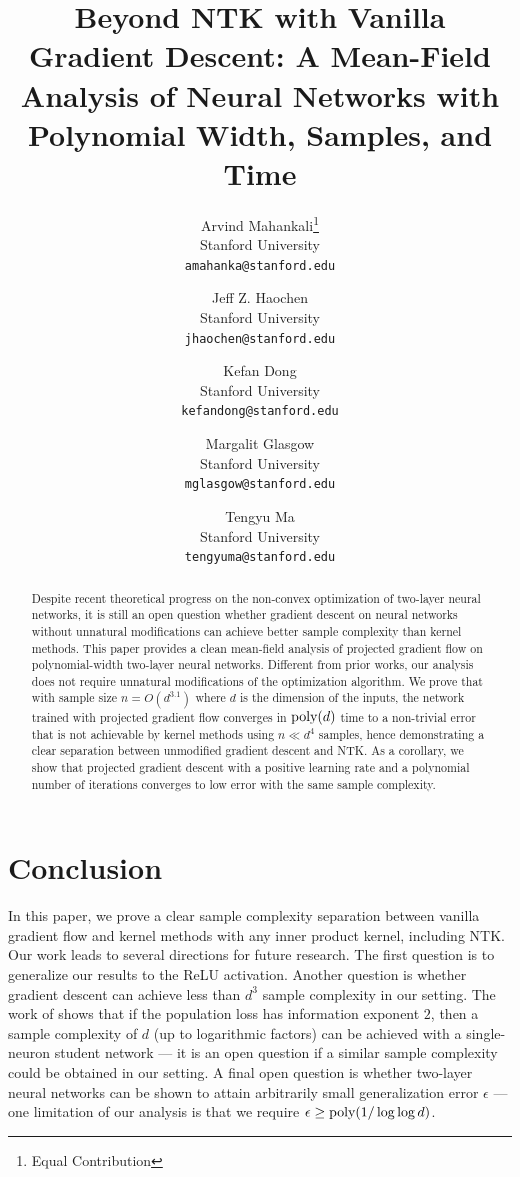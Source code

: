 \documentclass{article}
\title{Beyond NTK with Vanilla Gradient Descent: A Mean-Field Analysis of Neural Networks with Polynomial Width, Samples, and Time}
\author{%
Arvind Mahankali\thanks{Equal Contribution} \\
Stanford University\\
\texttt{amahanka@stanford.edu} \\
\and
Jeff Z. Haochen\footnotemark[1] \\
Stanford University\\
\texttt{jhaochen@stanford.edu} \\
\and
Kefan Dong \\
Stanford University\\
\texttt{kefandong@stanford.edu} \\
\and
Margalit Glasgow \\
Stanford University\\
\texttt{mglasgow@stanford.edu} \\
\and
Tengyu Ma \\
Stanford University \\
\texttt{tengyuma@stanford.edu}
}
\numberwithin{equation}{section}
\numberwithin{theorem}{section}
\begin{document}
	
	
\maketitle
	


 
	\begin{abstract}
		Despite recent theoretical progress on the non-convex optimization of two-layer neural networks, it is still an open question whether gradient descent on neural networks without unnatural modifications can achieve better sample complexity than kernel methods. This paper provides a clean mean-field analysis of projected gradient flow on polynomial-width two-layer neural networks. 
		Different from prior works, our analysis does not require unnatural modifications of the optimization algorithm. We prove that with sample size $n = O(d^{3.1})$ where $d$ is the dimension of the inputs, the network trained with projected gradient flow converges in $\textup{poly}(d)$ time to a non-trivial error that is not achievable by kernel methods using $n \ll  d^4$ samples, hence demonstrating a clear separation between unmodified gradient descent and NTK. As a corollary, we show that projected gradient descent with a positive learning rate and a polynomial number of iterations converges to low error with the same sample complexity.
	\end{abstract}












\section{Conclusion}

In this paper, we prove a clear sample complexity separation between vanilla gradient flow and kernel methods with any inner product kernel, including NTK. Our work leads to several directions for future research. The first question is to generalize our results to the ReLU activation. Another question is whether gradient descent can achieve less than $d^3$ sample complexity in our setting. The work of \citet{arous2021online} shows that if the population loss has information exponent $2$, then a sample complexity of $d$ (up to logarithmic factors) can be achieved with a single-neuron student network --- it is an open question if a similar sample complexity could be obtained in our setting. A final open question is whether two-layer neural networks can be shown to attain arbitrarily small generalization error $\epsilon$ --- one limitation of our analysis is that we require $\epsilon\ge \textup{poly}(1/\log \log d)$.
\end{document}
